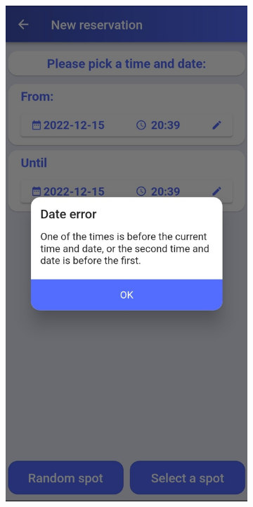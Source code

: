\clearpage

\begin{figure}[htp]
     \centering
     \begin{subfigure}[b]{0.30\textwidth}
         \centering
         \includegraphics[width=\textwidth]{images/app/dialog1.jpg}

\end{subfigure}
\end{figure}
